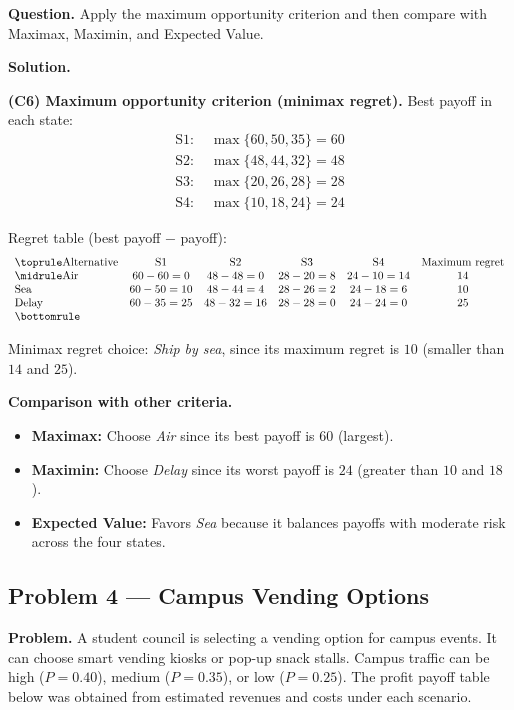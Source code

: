 	\textbf{Question.} Apply the maximum opportunity criterion and then compare with Maximax, Maximin, and Expected Value.
	
	\textbf{Solution.}
	
	\textbf{(C6) Maximum opportunity criterion (minimax regret).} Best payoff in each state:
	\[
	\begin{aligned}
		\text{S1: } &\max\{60, 50, 35\} = 60\\
		\text{S2: } &\max\{48, 44, 32\} = 48\\
		\text{S3: } &\max\{20, 26, 28\} = 28\\
		\text{S4: } &\max\{10, 18, 24\} = 24
	\end{aligned}
	\]
	
	Regret table (best payoff $-$ payoff):
	\[
	\begin{array}{lccccc}
		\toprule
		\text{Alternative} & \text{S1} & \text{S2} & \text{S3} & \text{S4} & \text{Maximum regret}\\
		\midrule
		\text{Air} & 60-60=0 & 48-48=0 & 28-20=8 & 24-10=14 & 14\\
		\text{Sea} & 60-50=10 & 48-44=4 & 28-26=2 & 24-18=6 & 10\\
		\text{Delay} & 60-35=25 & 48-32=16 & 28-28=0 & 24-24=0 & 25\\
		\bottomrule
	\end{array}
	\]
	
	Minimax regret choice: \emph{Ship by sea}, since its maximum regret is $10$ (smaller than $14$ and $25$).
	
	\textbf{Comparison with other criteria.}
	\begin{itemize}
		\item \textbf{Maximax:} Choose \emph{Air} since its best payoff is $60$ (largest).
		\item \textbf{Maximin:} Choose \emph{Delay} since its worst payoff is $24$ (greater than $10$ and $18$).
		\item \textbf{Expected Value:} Favors \emph{Sea} because it balances payoffs with moderate risk across the four states.
	\end{itemize}
	
	\hypertarget{c6-ex4}{}
	\subsection*{Problem 4 — Campus Vending Options}
	
	\textbf{Problem.} A student council is selecting a vending option for campus events. It can choose smart vending kiosks or pop-up snack stalls. Campus traffic can be high ($P=0.40$), medium ($P=0.35$), or low ($P=0.25$). The profit payoff table below was obtained from estimated revenues and costs under each scenario.
	
